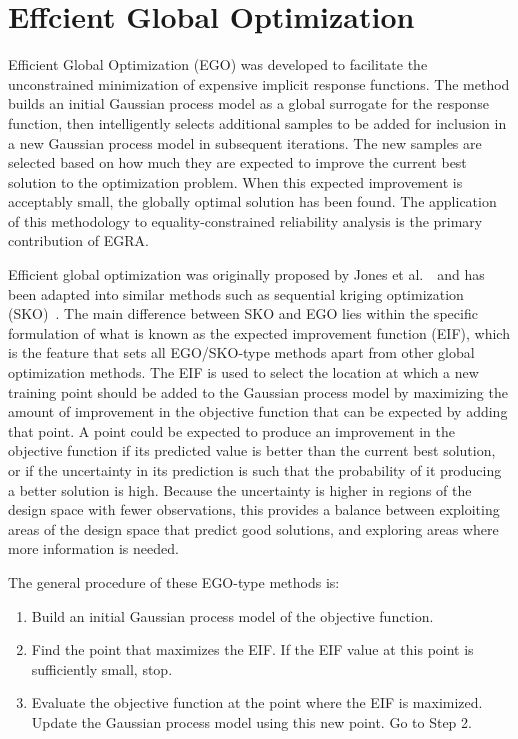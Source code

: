 \chapter{Effcient Global Optimization}\label{uq:ego}

Efficient Global Optimization (EGO) was developed to facilitate the 
unconstrained minimization of expensive implicit response functions.
The method builds an initial Gaussian process model as a global surrogate 
for the response function, then intelligently selects additional samples 
to be added for inclusion in a new Gaussian process model in subsequent 
iterations. The new samples are selected based on how much they are expected 
to improve the current best solution to the optimization problem.
When this expected improvement is acceptably small, the globally optimal 
solution has been found. The application of this methodology to 
equality-constrained reliability analysis is the primary contribution of 
EGRA.  

Efficient global optimization was originally proposed by
Jones et al.~\cite{Jon98}~and has been adapted into similar methods
such as sequential kriging optimization (SKO)~\cite{Hua06}.
The main difference between SKO and EGO lies within the specific formulation
of what is known as the expected improvement function (EIF), which is the
feature that sets all EGO/SKO-type methods apart from other global optimization
methods.
The EIF is used to select the location at which a new training point should be
added to the Gaussian process model by maximizing the amount of improvement in 
the objective function that can be expected by adding that point.
A point could be expected to produce an improvement in the objective function
if its predicted value is better than the current best solution, or if the
uncertainty in its prediction is such that the probability of it producing
a better solution is high.
Because the uncertainty is higher in regions of the design space with fewer
observations, this provides a balance between exploiting areas of the
design space that predict good solutions, and exploring areas where more
information is needed.

The general procedure of these EGO-type methods is:
\begin{enumerate}
\item Build an initial Gaussian process model of the objective function.
\item Find the point that maximizes the EIF.
      If the EIF value at this point is sufficiently small, stop.
\item Evaluate the objective function at the point where the EIF is maximized.
      Update the Gaussian process model using this new point.
      Go to Step 2.
\end{enumerate}
\noindent 

